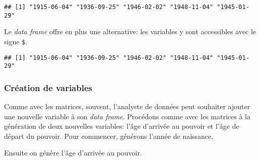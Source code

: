 \documentclass[]{book}
\newenvironment{Shaded}{\begin{snugshade}}{\end{snugshade}}
\newcommand{\KeywordTok}[1]{\textcolor[rgb]{0.13,0.29,0.53}{\textbf{#1}}}
\newcommand{\StringTok}[1]{\textcolor[rgb]{0.31,0.60,0.02}{#1}}
\newcommand{\OperatorTok}[1]{\textcolor[rgb]{0.81,0.36,0.00}{\textbf{#1}}}
\newcommand{\NormalTok}[1]{#1}
\begin{document}
\begin{verbatim}
## [1] "1915-06-04" "1936-09-25" "1946-02-02" "1948-11-04" "1945-01-29"
\end{verbatim}

Le \emph{data frame} offre en plus une alternative: les variables y sont
accessibles avec le signe \texttt{\$}.

\begin{Shaded}
\end{Shaded}

\begin{verbatim}
## [1] "1915-06-04" "1936-09-25" "1946-02-02" "1948-11-04" "1945-01-29"
\end{verbatim}

\subsubsection{Création de variables}\label{creation-de-variables}

Comme avec les matrices, souvent, l'analyste de données peut souhaiter
ajouter une nouvelle variable à son \emph{data frame}. Procédons comme
avec les matrices à la génération de deux nouvelles variables: l'âge
d'arrivée au pouvoir et l'âge de départ du pouvoir. Pour commencer,
générons l'année de naissance.

\begin{Shaded}
\end{Shaded}

Ensuite on génère l'âge d'arrivée au pouvoir.

\begin{Shaded}
\end{Shaded}
\end{document}
